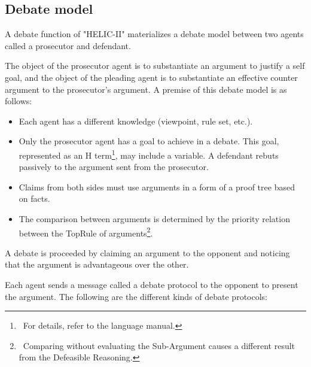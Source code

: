 \subsection{Debate model}\label{Debate model}

A debate function of "HELIC-II" materializes a debate model between two agents called a prosecutor and defendant.

The object of the prosecutor agent is to substantiate an argument to justify a self goal, and the object of the pleading agent is to substantiate an effective counter argument to the prosecutor's argument.
A premise of this debate model is as follows:

\begin{itemize}

\item Each agent has a different knowledge (viewpoint, rule set, etc.).
\item Only the prosecutor agent has a goal to achieve in a debate.
This goal, represented as an H term\footnote{\ For details, refer to the language manual.}, may include a variable.
A defendant rebuts passively to the argument sent from the prosecutor.
\item Claims from both sides must use arguments in a form of a proof tree based on facts.
\item The comparison between arguments is determined by the priority
  relation between the TopRule of arguments\footnote{\ Comparing without evaluating the Sub-Argument causes a different result from the Defeasible Reasoning.}.

\end{itemize}

A debate is proceeded by claiming an argument to the opponent and noticing that the argument is advantageous over the other.

% 

Each agent sends a message called a debate protocol to the opponent to present the argument.
The following are the different kinds of debate protocols:

